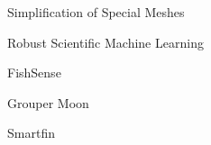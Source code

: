 \item Simplification of Special Meshes
\item Robust Scientific Machine Learning
\item FishSense
\item Grouper Moon
\item Smartfin
